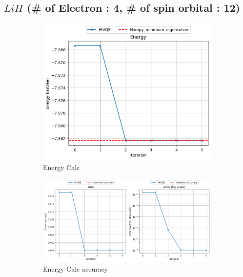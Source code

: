 \documentclass[11pt]{article}
\begin{document}
\subsection{\(LiH\) (\# of Electron : 4, \# of spin orbital : 12)}
\begin{figure}[H]
  \centering
  \begin{subfigure}[b]{0.25\textwidth}
    \includegraphics[width=\textwidth]{fig/LiH_E.png}
    \caption{Energy Calc}
    \label{fig:first}
  \end{subfigure}
  \hfill
  \vrule width 1pt  %
  \hfill
  \begin{subfigure}[b]{0.40\textwidth}
    \includegraphics[width=\textwidth]{fig/LiH_dE.png}
    \caption{Energy Calc accuracy}
    \label{fig:second}
  \end{subfigure}
  \hfill
  \vrule width 1pt  %
  \hfill
  \begin{subfigure}[b]{0.25\textwidth}

\end{subfigure}
\end{figure}
\end{document}

